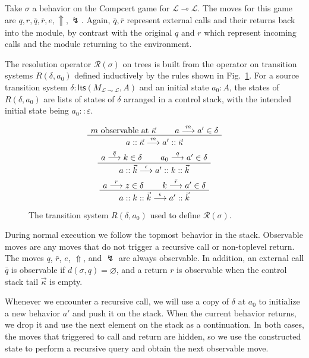 \documentclass[11pt]{article}
\newcommand{\kw}[1]{{\mathsf{#1}}}
\begin{document}
Take $\sigma$ a behavior on the Compcert game for
$\mathcal{L} \multimap \mathcal{L}$.
The moves for this game are $q, r, \bar{q}, \bar{r}, e, \Uparrow, \lightning$.
Again, $\bar{q}, \bar{r}$ represent external calls and their returns
back into the module,
by contrast with the original $q$ and $r$ which represent
incoming calls and the module returning to the environment.

The resolution operator $\mathcal{R}(\sigma)$ on trees is built from
the operator on transition systems $R(\delta, a_0)$
defined inductively by the rules shown in Fig.~\ref{fig:res}.
For a source transition system
$\delta : \kw{lts}(M_{\mathcal{L} \multimap \mathcal{L}}, A)$
and an initial state $a_0 : A$,
the states of $R(\delta, a_0)$ are lists of states of $\delta$ arranged in a control stack,
with the intended initial state being $a_0 :: \varepsilon$.

\begin{figure}
\[
  \AxiomC{$m \mbox{ observable at } \vec{\kappa}$}
  \AxiomC{$a \stackrel{m}{\longrightarrow} a' \in \delta$}
  \BinaryInfC{$a :: \vec{\kappa} \stackrel{m}{\longrightarrow} a' :: \vec{\kappa}$}
  \DisplayProof
\]
\vspace{.5em}
\[
  \AxiomC{$a \stackrel{\bar{q}}{\longrightarrow} k \in \delta$}
  \AxiomC{$a_0 \stackrel{q}{\longrightarrow} a' \in \delta$}
  \BinaryInfC{$a :: \vec{k} \stackrel{\epsilon}{\longrightarrow} a' :: k :: \vec{k}$}
  \DisplayProof
\]
\vspace{.5em}
\[
  \AxiomC{$a \stackrel{r}{\longrightarrow} z \in \delta$}
  \AxiomC{$k \stackrel{\bar{r}}{\longrightarrow} a' \in \delta$}
  \BinaryInfC{$a :: k :: \vec{k} \stackrel{\epsilon}{\longrightarrow} a' :: \vec{k}$}
  \DisplayProof
\]
\caption{The transition system $R(\delta, a_0)$ used to define $\mathcal{R}(\sigma)$.}
\label{fig:res}
\end{figure}

During normal execution we follow the topmost behavior in the stack.
Observable moves are any moves that do not trigger a recursive call
or non-toplevel return.
The moves $q$, $\bar{r}$, $e$, $\Uparrow$, and $\lightning$
are always observable.
In addition,
an external call $\bar{q}$
is observable if $d(\sigma, q) = \varnothing$,
and a return $r$
is observable when the control stack tail $\vec{\kappa}$ is empty.

Whenever we encounter a recursive call,
we will use a copy of $\delta$ at $a_0$
to initialize a new behavior $a'$ and push it on the stack.
When the current behavior returns,
we drop it and use the next element on the stack as a continuation.
In both cases,
the moves that triggered to call and return are hidden,
so we use the constructed state to perform a recursive query
and obtain the next observable move.
\end{document}
